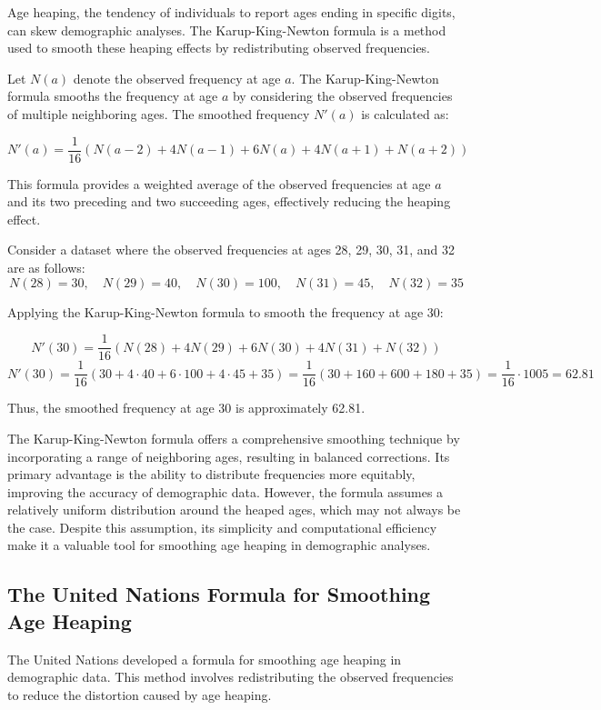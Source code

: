 \documentclass[pdflatex,sn-mathphys-num]{sn-jnl}%
\theoremstyle{thmstyleone}%
\theoremstyle{thmstyletwo}%
\theoremstyle{thmstylethree}%
\begin{document}
Age heaping, the tendency of individuals to report ages ending in specific digits, can skew demographic analyses. The Karup-King-Newton formula \citep{karup1903} is a method used to smooth these heaping effects by redistributing observed frequencies.

Let \( N(a) \) denote the observed frequency at age \( a \). The Karup-King-Newton formula smooths the frequency at age \( a \) by considering the observed frequencies of multiple neighboring ages. The smoothed frequency \( N'(a) \) is calculated as:

\[
N'(a) = \frac{1}{16} \left( N(a-2) + 4N(a-1) + 6N(a) + 4N(a+1) + N(a+2) \right)
\]

This formula provides a weighted average of the observed frequencies at age \( a \) and its two preceding and two succeeding ages, effectively reducing the heaping effect.


Consider a dataset where the observed frequencies at ages 28, 29, 30, 31, and 32 are as follows:
\[
N(28) = 30, \quad N(29) = 40, \quad N(30) = 100, \quad N(31) = 45, \quad N(32) = 35
\]

Applying the Karup-King-Newton formula to smooth the frequency at age 30:

\[
N'(30) = \frac{1}{16} \left( N(28) + 4N(29) + 6N(30) + 4N(31) + N(32) \right)
\]
\[
N'(30) = \frac{1}{16} \left( 30 + 4 \cdot 40 + 6 \cdot 100 + 4 \cdot 45 + 35 \right) = \frac{1}{16} \left( 30 + 160 + 600 + 180 + 35 \right) = \frac{1}{16} \cdot 1005 = 62.81
\]

Thus, the smoothed frequency at age 30 is approximately 62.81.


The Karup-King-Newton formula offers a comprehensive smoothing technique by incorporating a range of neighboring ages, resulting in balanced corrections. Its primary advantage is the ability to distribute frequencies more equitably, improving the accuracy of demographic data. However, the formula assumes a relatively uniform distribution around the heaped ages, which may not always be the case. Despite this assumption, its simplicity and computational efficiency make it a valuable tool for smoothing age heaping in demographic analyses.


\subsection{The United Nations Formula for Smoothing Age Heaping}

The United Nations \citep{un1956} developed a formula for smoothing age heaping in demographic data. This method involves redistributing the observed frequencies to reduce the distortion caused by age heaping.
\end{document}
